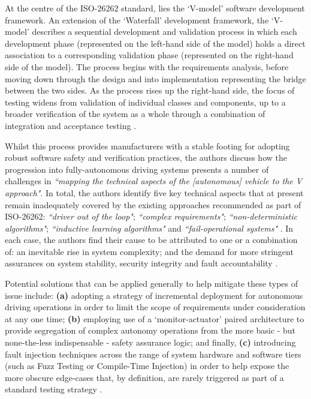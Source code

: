 \documentclass[conference]{IEEEtran}
\begin{document}
At the centre of the ISO-26262 standard, lies the `V-model' software development framework. An extension of the `Waterfall' development framework, the `V-model' describes a sequential development and validation process in which each development phase (represented on the left-hand side of the model) holds a direct association to a corresponding validation phase (represented on the right-hand side of the model). The process begins with the requirements analysis, before moving down through the design and into implementation representing the bridge between the two sides. As the process rises up the right-hand side, the focus of testing widens from validation of individual classes and components, up to a broader verification of the system as a whole through a combination of integration and acceptance testing \cite{wagner-2}. 

Whilst this process provides manufacturers with a stable footing for adopting robust software safety and verification practices, the authors discuss how the progression into fully-autonomous driving systems presents a number of challenges in \textit{``mapping the technical aspects of the [autonomous] vehicle to the V approach"}. In total, the authors identify five key technical aspects that at present remain inadequately covered by the existing approaches recommended as part of ISO-26262: \textit{``driver out of the loop"}; \textit{``complex requirements"}; \textit{``non-deterministic algorithms"}; \textit{``inductive learning algorithms"} and \textit{``fail-operational systems"} \cite{wagner-2}. In each case, the authors find their cause to be attributed to one or a combination of: an inevitable rise in system complexity; and the demand for more stringent assurances on system stability, security integrity and fault accountability \cite{wagner-2}. 

Potential solutions that can be applied generally to help mitigate these types of issue include: \textbf{(a)} adopting a strategy of incremental deployment for autonomous driving operations in order to limit the scope of requirements under consideration at any one time; \textbf{(b)} employing use of a `monitor-actuator' paired architecture to provide segregation of complex autonomy operations from the more basic - but none-the-less indispensable - safety assurance logic; and finally, \textbf{(c)} introducing fault injection techniques across the range of system hardware and software tiers (such as Fuzz Testing \cite{wagner-1} or Compile-Time Injection) in order to help expose the more obscure edge-cases that, by definition, are rarely triggered as part of a standard testing strategy \cite{wagner-2}. 
\end{document}
